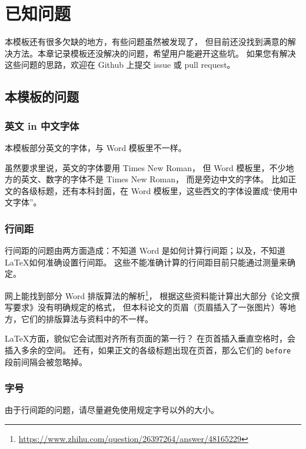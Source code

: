 \chapter{已知问题}

本模板还有很多欠缺的地方，有些问题虽然被发现了，
但目前还没找到满意的解决方法。本章记录模板还没解决的问题，希望用户能避开这些坑。
如果您有解决这些问题的思路，欢迎在 Github 上提交 issue 或 pull request。

\section{本模板的问题}

\subsection{英文 in 中文字体}

本模板部分英文的字体，与 Word 模板里不一样。

虽然要求里说，英文的字体要用 Times New Roman\textsuperscript{\textregistered}，
但 Word 模板里，不少地方的英文、数字的字体不是 Times New Roman\textsuperscript{\textregistered}，
而是旁边中文的字体。
比如正文的各级标题，还有本科封面，在 Word 模板里，这些西文的字体设置成“使用中文字体”。

\subsection{行间距}

行间距的问题由两方面造成：不知道 Word 是如何计算行间距；以及，不知道 \LaTeX 如何准确设置行间距。
这些不能准确计算的行间距目前只能通过测量来确定。


网上能找到部分 Word 排版算法的解析\footnote{\url{https://www.zhihu.com/question/26397264/answer/48165229}}，
根据这些资料能计算出大部分《论文撰写要求》没有明确规定的格式，
但本科论文的页眉（页眉插入了一张图片）等地方，它们的排版算法与资料中的不一样。

\LaTeX 方面，貌似它会试图对齐所有页面的第一行？
在页首插入垂直空格时，会插入多余的空间。
还有，如果正文的各级标题出现在页首，那么它们的 \texttt{before} 段前间隔会被忽略掉。

\subsection{字号}

由于行间距的问题，请尽量避免使用规定字号以外的大小。


